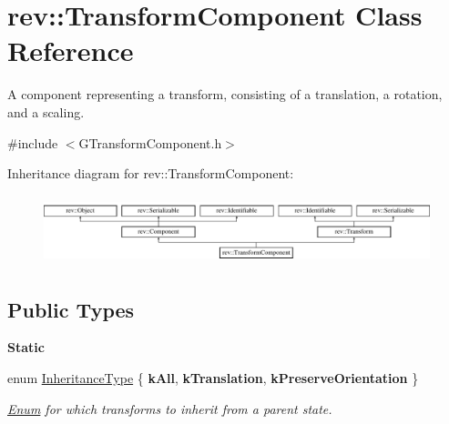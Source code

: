 \hypertarget{classrev_1_1_transform_component}{}\section{rev\+::Transform\+Component Class Reference}
\label{classrev_1_1_transform_component}


A component representing a transform, consisting of a translation, a rotation, and a scaling.  




{\ttfamily \#include $<$G\+Transform\+Component.\+h$>$}

Inheritance diagram for rev\+::Transform\+Component\+:\begin{figure}[H]
\begin{center}
\leavevmode
\includegraphics[height=2.036364cm]{classrev_1_1_transform_component}
\end{center}
\end{figure}
\subsection*{Public Types}
\begin{Indent}\textbf{ Static}\par
\begin{DoxyCompactItemize}
\item 
\mbox{\label{classrev_1_1_transform_component_acba932376224625d00acebea577a7a90}} 
enum \mbox{\hyperlink{classrev_1_1_transform_component_acba932376224625d00acebea577a7a90}{Inheritance\+Type}} \{ {\bfseries k\+All}, 
{\bfseries k\+Translation}, 
{\bfseries k\+Preserve\+Orientation}
 \}
\begin{DoxyCompactList}\small\item\em \mbox{\hyperlink{struct_enum}{Enum}} for which transforms to inherit from a parent state. \end{DoxyCompactList}\end{DoxyCompactItemize}
\end{Indent}
